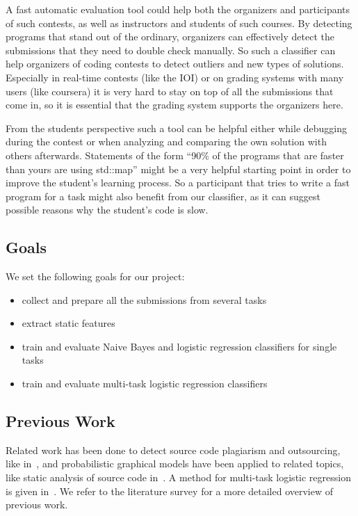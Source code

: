 A fast automatic evaluation tool could help both the organizers and participants of such contests, as well as instructors and students of such courses.
By detecting programs that stand out of the ordinary, organizers can effectively detect the submissions that they need to double check manually.
So such a classifier can help organizers of coding contests to detect outliers and new types of solutions. 
Especially in real-time contests (like the IOI) or on grading systems with many users (like coursera) it is very hard to stay on top of all the submissions that come in, so it is essential that the grading system supports the organizers here.

From the students perspective such a tool can be helpful either while debugging during the contest or when analyzing and comparing the own solution with others afterwards. Statements of the form “90\% of the programs that are faster than yours are using std::map” might be a very helpful starting point in order to improve the student’s learning process. So a participant that tries to write a fast program for a task might also benefit from our classifier, as it can suggest possible reasons why the student's code is slow.

\subsection*{Goals}
We set the following goals for our project:
\begin{itemize}
\item collect and prepare all the submissions from several tasks
\item extract static features 
\item train and evaluate Naive Bayes and logistic regression classifiers for single tasks
\item train and evaluate multi-task logistic regression classifiers
\end{itemize}

\subsection*{Previous Work}
Related work has been done to detect source code plagiarism and outsourcing, like in~\cite{Elenbogen}, and probabilistic graphical models have been applied to related topics, like static analysis of source code in~\cite{Kremenek}. 
A method for multi-task logistic regression is given in~\cite{Kremenek}.
We refer to the literature survey for a more detailed overview of previous work.
